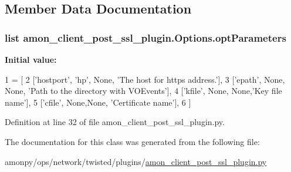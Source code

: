 \subsection{Member Data Documentation}
\hypertarget{classamon__client__post__ssl__plugin_1_1_options_a0dfe7b36199a42381c74c2b2df720066}{
\subsubsection[{opt\-Parameters}]{\setlength{\rightskip}{0pt plus 5cm}list amon\-\_\-client\-\_\-post\-\_\-ssl\-\_\-plugin.\-Options.\-opt\-Parameters\hspace{0.3cm}{\ttfamily [static]}}}\label{classamon__client__post__ssl__plugin_1_1_options_a0dfe7b36199a42381c74c2b2df720066}
{\bfseries Initial value\-:}
\begin{DoxyCode}
1 = [
2         [\textcolor{stringliteral}{'hostport'}, \textcolor{stringliteral}{'hp'}, \textcolor{keywordtype}{None}, \textcolor{stringliteral}{'The host for https address.'}],
3         [\textcolor{stringliteral}{'epath'}, \textcolor{keywordtype}{None}, \textcolor{keywordtype}{None}, \textcolor{stringliteral}{'Path to the directory with VOEvents'}],
4         [\textcolor{stringliteral}{'kfile'}, \textcolor{keywordtype}{None}, \textcolor{keywordtype}{None},\textcolor{stringliteral}{'Key file name'}],
5         [\textcolor{stringliteral}{'cfile'}, \textcolor{keywordtype}{None},\textcolor{keywordtype}{None}, \textcolor{stringliteral}{'Certificate name'}],
6         ]
\end{DoxyCode}


Definition at line 32 of file amon\-\_\-client\-\_\-post\-\_\-ssl\-\_\-plugin.\-py.



The documentation for this class was generated from the following file\-:\begin{DoxyCompactItemize}
\item 
amonpy/ops/network/twisted/plugins/\hyperlink{amon__client__post__ssl__plugin_8py}{amon\-\_\-client\-\_\-post\-\_\-ssl\-\_\-plugin.\-py}\end{DoxyCompactItemize}

